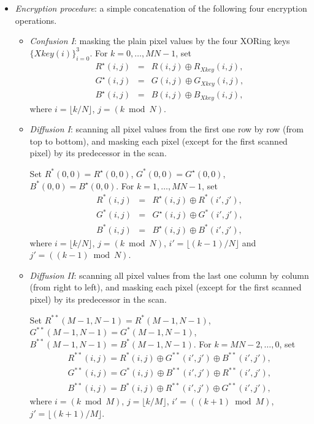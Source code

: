 \documentclass[twocolumn]{svjour3}
\newcommand\Xkey{\textit{Xkey}}
\begin{document}
\begin{itemize}
\item
\textit{Encryption procedure}: a simple concatenation of the
following four encryption operations.

\begin{itemize}
\item
\textit{Confusion I}: masking the plain pixel values by the four
XORing keys $\{\textit{Xkey}(i)\}_{i=0}^3$.
For $k=0,\ldots,MN-1$, set
\begin{eqnarray*}
R^{\star}(i,j) & = & R(i,j)\oplus R_{\Xkey}(i,j),\\
G^{\star}(i,j) & = & G(i,j)\oplus G_{\Xkey}(i,j),\\
B^{\star}(i,j) & = & B(i,j)\oplus B_{\Xkey}(i,j),
\end{eqnarray*}
where $i=\lfloor k/N\rfloor$, $j=(k\bmod N)$.

\item
\textit{Diffusion I}: scanning all pixel values from the first one
row by row (from top to bottom), and masking each pixel (except for
the first scanned pixel) by its predecessor in the scan.

Set $R^{*}(0, 0)=R^{\star}(0, 0)$, $G^{*}(0, 0)=G^{\star}(0, 0)$,
$B^{*}(0, 0)=B^{\star}(0, 0)$. For $k=1,\ldots,MN-1$, set
\begin{eqnarray*}
R^{*}(i, j) & = &  R^{\star}(i, j) \oplus R^{*}(i', j'),\\
G^{*}(i, j) & = &  G^{\star}(i, j) \oplus G^{*}(i', j'),\\
B^{*}(i, j) & = &  B^{\star}(i, j) \oplus B^{*}(i', j'),
\end{eqnarray*}
where $i=\lfloor k/N\rfloor$, $j=(k\bmod N)$, $i'=\lfloor
(k-1)/N\rfloor$ and $j'=((k-1)\bmod N)$.

\item
\textit{Diffusion II}: scanning all pixel values from the last one
column by column (from right to left), and masking each pixel
(except for the first scanned pixel) by its predecessor in the scan.

Set $R^{**}(M-1, N-1)=R^{*}(M-1, N-1)$, $G^{**}(M-1, N-1)=G^{*}(M-1,
N-1)$, $B^{**}(M-1, N-1)=B^{*}(M-1, N-1)$. For $k=MN-2,\ldots,0$, set
\begin{eqnarray*}
R^{**}(i, j)  =  R^{*}(i, j)\oplus G^{**}(i',j')\oplus B^{**}(i',j'),\\
G^{**}(i, j)  =  G^{*}(i, j)\oplus B^{**}(i',j')\oplus R^{**}(i',j'),\\
B^{**}(i, j)  =  B^{*}(i, j)\oplus R^{**}(i',j')\oplus
G^{**}(i', j'),
\end{eqnarray*}
where $i=(k\bmod M)$, $j=\lfloor k/M \rfloor$, $i'=((k+1)\bmod M)$,
$j'=\lfloor (k+1)/M \rfloor$.


\end{itemize}
\end{itemize}
\end{document}
